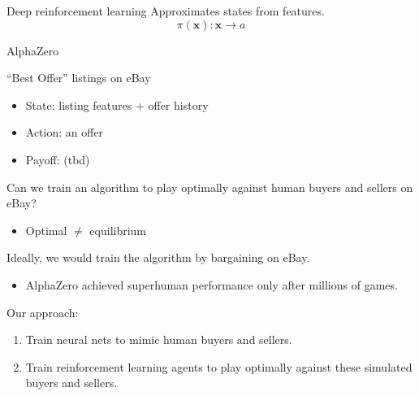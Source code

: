 \documentclass{beamer}
\begin{document}
\begin{frame}{Deep reinforcement learning}
	Approximates states from features.
	$$\pi(\boldsymbol{x}): \boldsymbol{x} \rightarrow a$$
\end{frame}

\begin{frame}{AlphaZero}

\end{frame}

\begin{frame}{``Best Offer'' listings on eBay}
	\begin{itemize}
		\item State: listing features + offer history
		\item Action: an offer
		\item Payoff: (tbd)
	\end{itemize}
	\vspace{5mm}
	Can we train an algorithm to play optimally against human buyers and sellers on eBay?\pause
	\begin{itemize}
		\item Optimal $\neq$ equilibrium
	\end{itemize}
\end{frame}


\begin{frame}
	Ideally, we would train the algorithm by bargaining on eBay.
	\begin{itemize}
		\item AlphaZero achieved superhuman performance only after millions of games.
	\end{itemize}\pause
	\vspace{5mm}
	Our approach:
	\begin{enumerate}
		\item Train neural nets to mimic human buyers and sellers.
		\item Train reinforcement learning agents to play optimally against these simulated buyers and sellers.
	\end{enumerate}
\end{frame}
\end{document}
